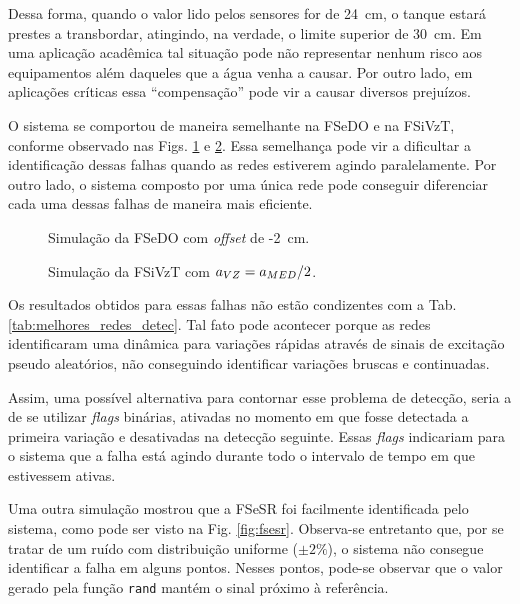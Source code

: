 Dessa forma, quando o valor lido pelos sensores for de 24\ cm, o tanque estará
prestes a transbordar, atingindo, na verdade, o limite superior de 30\ cm. Em
uma aplicação acadêmica tal situação pode não representar nenhum risco aos
equipamentos além daqueles que a água venha a causar. Por outro lado, em
aplicações críticas essa ``compensação'' pode vir a causar diversos prejuízos.

O sistema se comportou de maneira semelhante na FSeDO e na FSiVzT, conforme
observado nas Figs. \ref{fig:fsedo} e \ref{fig:fsivzt}. Essa semelhança pode vir
a dificultar a identificação dessas falhas quando as redes estiverem agindo
paralelamente. Por outro lado, o sistema composto por uma única rede pode
conseguir diferenciar cada uma dessas falhas de maneira mais eficiente. 

\begin{figure}[htb]
\footnotesize
\centering

\vspace{1cm}
\caption{Simulação da FSeDO com {\it offset} de -2\ cm.}
\label{fig:fsedo}
\end{figure}

\begin{figure}[htb]
\footnotesize
\centering

\vspace{1cm}
\caption{Simulação da FSiVzT com $a_{\tiny VZ} = a_{\tiny MED}/2$.}
\label{fig:fsivzt}
\end{figure}

Os resultados obtidos para essas falhas não estão condizentes com a Tab.
\ref{tab:melhores_redes_detec}. Tal fato pode acontecer porque as redes
identificaram uma dinâmica para variações rápidas através de sinais de excitação
pseudo aleatórios, não conseguindo identificar variações bruscas e continuadas.

Assim, uma possível alternativa para contornar esse problema de detecção, seria
a de se utilizar {\it flags} binárias, ativadas no momento em que fosse
detectada a primeira variação e desativadas na detecção seguinte. Essas {\it
flags} indicariam para o sistema que a falha está agindo durante todo o
intervalo de tempo em que estivessem ativas.

Uma outra simulação mostrou que a FSeSR foi facilmente identificada pelo
sistema, como pode ser visto na Fig. \ref{fig:fsesr}. Observa-se entretanto que,
por se tratar de um ruído com distribuição uniforme ($\pm 2\%$), o sistema não
consegue identificar a falha em alguns pontos. Nesses pontos, pode-se observar
que o valor gerado pela função {\tt rand} mantém o sinal próximo à referência.

